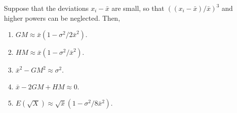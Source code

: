 \documentclass[11pt]{article}
\theoremstyle{definition}
\theoremstyle{remark}
\numberwithin{equation}{section}
\begin{document}
    \begin{exercise}
        Suppose that the deviations $x_i - \bar{x}$ are small, so that $((x_i -
        \bar{x}) / \bar{x})^3$ and higher powers can be neglected. Then, \begin{enumerate}
            \item $GM \approx \bar{x}(1 - \sigma^2 / 2\bar{x}^2)$.
            \item $HM \approx \bar{x}(1 - \sigma^2 / \bar{x}^2)$.
            \item $\bar{x}^2 - GM^2 \approx \sigma^2$.
            \item $\bar{x} - 2GM + HM \approx 0$.
            \item $E(\sqrt{X}) \approx \sqrt{\bar{x}}(1 - \sigma^2 / 8\bar{x}^2)$.
        \end{enumerate}
    \end{exercise}
\end{document}
